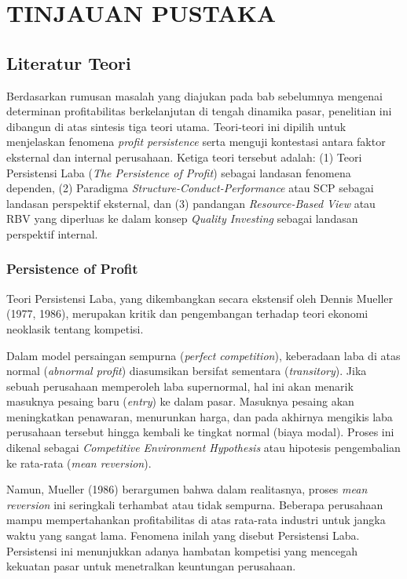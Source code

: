 \documentclass[12pt,a4paper]{report}
\begin{document}
\chapter{TINJAUAN PUSTAKA}

\section{Literatur Teori}

Berdasarkan rumusan masalah yang diajukan pada bab sebelumnya mengenai determinan profitabilitas berkelanjutan di tengah dinamika pasar, penelitian ini dibangun di atas sintesis tiga teori utama. Teori-teori ini dipilih untuk menjelaskan fenomena \textit{profit persistence} serta menguji kontestasi antara faktor eksternal dan internal perusahaan. Ketiga teori tersebut adalah: (1) Teori Persistensi Laba (\textit{The Persistence of Profit}) sebagai landasan fenomena dependen, (2) Paradigma \textit{Structure-Conduct-Performance} atau SCP sebagai landasan perspektif eksternal, dan (3) pandangan \textit{Resource-Based View} atau RBV yang diperluas ke dalam konsep \textit{Quality Investing} sebagai landasan perspektif internal.

\subsection{Persistence of Profit}

Teori Persistensi Laba, yang dikembangkan secara ekstensif oleh Dennis Mueller (1977, 1986), merupakan kritik dan pengembangan terhadap teori ekonomi neoklasik tentang kompetisi.

Dalam model persaingan sempurna (\textit{perfect competition}), keberadaan laba di atas normal (\textit{abnormal profit}) diasumsikan bersifat sementara (\textit{transitory}). Jika sebuah perusahaan memperoleh laba supernormal, hal ini akan menarik masuknya pesaing baru (\textit{entry}) ke dalam pasar. Masuknya pesaing akan meningkatkan penawaran, menurunkan harga, dan pada akhirnya mengikis laba perusahaan tersebut hingga kembali ke tingkat normal (biaya modal). Proses ini dikenal sebagai \textit{Competitive Environment Hypothesis} atau hipotesis pengembalian ke rata-rata (\textit{mean reversion}).

Namun, Mueller (1986) berargumen bahwa dalam realitasnya, proses \textit{mean reversion} ini seringkali terhambat atau tidak sempurna. Beberapa perusahaan mampu mempertahankan profitabilitas di atas rata-rata industri untuk jangka waktu yang sangat lama. Fenomena inilah yang disebut Persistensi Laba. Persistensi ini menunjukkan adanya hambatan kompetisi yang mencegah kekuatan pasar untuk menetralkan keuntungan perusahaan.
\end{document}
